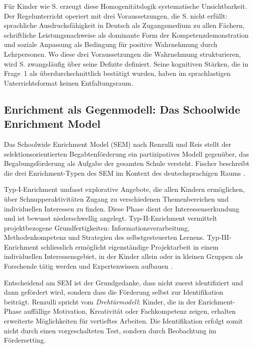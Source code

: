 \documentclass[ngerman, a4paper]{article}
\begin{document}
Für Kinder wie S. erzeugt diese Homogenitätslogik systematische Unsichtbarkeit.
Der Regelunterricht operiert mit drei Voraussetzungen, die S. nicht erfüllt: sprachliche
Ausdrucksfähigkeit in Deutsch als Zugangsmedium zu allen Fächern, schriftliche
Leistungsnachweise als dominante Form der Kompetenzdemonstration und soziale
Anpassung als Bedingung für positive Wahrnehmung durch Lehrpersonen. Wo diese drei
Voraussetzungen die Wahrnehmung strukturieren, wird S. zwangsläufig über seine Defizite
definiert. Seine kognitiven Stärken, die in Frage~1 als überdurchschnittlich bestätigt
wurden, haben im sprachlastigen Unterrichtsformat keinen Entfaltungsraum.

\subsection{Enrichment als Gegenmodell: Das Schoolwide Enrichment Model}

Das Schoolwide Enrichment Model (SEM) nach Renzulli und Reis stellt der
selektionsorientierten Begabtenförderung ein partizipatives Modell gegenüber, das
Begabungsförderung als Aufgabe der gesamten Schule versteht. Fischer beschreibt die
drei Enrichment-Typen des SEM im Kontext des deutschsprachigen Raums
\parencite{fischer2020begabungsfoerderung}.

Typ-I-Enrichment umfasst explorative Angebote, die allen Kindern ermöglichen, über
Schnupperaktivitäten Zugang zu verschiedenen Themenbereichen und individuellen
Interessen zu finden. Diese Phase dient der Interessenserkundung und ist bewusst
niederschwellig angelegt. Typ-II-Enrichment vermittelt projektbezogene Grundfertigkeiten:
Informationsverarbeitung, Methodenkompetenz und Strategien des selbstgesteuerten Lernens.
Typ-III-Enrichment schliesslich ermöglicht eigenständige Projektarbeit in einem
individuellen Interessensgebiet, in der Kinder allein oder in kleinen Gruppen als
Forschende tätig werden und Expertenwissen aufbauen
\parencite{muelleroppliger2021handbuch}.

Entscheidend am SEM ist der Grundgedanke, dass nicht zuerst identifiziert und dann
gefördert wird, sondern dass die Förderung selbst zur Identifikation beiträgt.
Renzulli spricht vom \textit{Drehtürmodell}: Kinder, die in der Enrichment-Phase
auffällige Motivation, Kreativität oder Fachkompetenz zeigen, erhalten erweiterte
Möglichkeiten für vertieftes Arbeiten. Die Identifikation erfolgt somit nicht durch
einen vorgeschalteten Test, sondern durch Beobachtung im Fördersetting.
\end{document}
